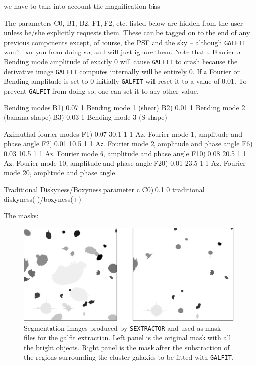 we have to take into account the magnification bias

The parameters C0, B1, B2, F1, F2, etc. listed below are hidden from the user unless he/she explicitly requests them.  These can  be tagged on to the end of any previous components except, of course, the PSF and the sky -- although \texttt{GALFIT} won't bar you from doing so, and will just ignore them.  Note that a Fourier or Bending mode amplitude of exactly 0 will cause \texttt{GALFIT} to crash because the derivative image \texttt{GALFIT} computes internally will be entirely 0.  If a Fourier or Bending amplitude is set to 0 initially \texttt{GALFIT} will reset it to a value of 0.01.  To prevent \texttt{GALFIT} from doing so, one can set it to any 
other value.

Bending modes
B1)  0.07      1        Bending mode 1 (shear)
B2)  0.01      1        Bending mode 2 (banana shape)
B3)  0.03      1        Bending mode 3 (S-shape)

Azimuthal fourier modes
F1)  0.07  30.1  1  1   Az. Fourier mode 1, amplitude and phase angle
F2)  0.01  10.5  1  1   Az. Fourier mode 2, amplitude and phase angle
F6)  0.03  10.5  1  1  Az. Fourier mode 6, amplitude and phase angle
F10)  0.08  20.5  1  1   Az. Fourier mode 10, amplitude and phase angle
F20)  0.01  23.5  1  1   Az. Fourier mode 20, amplitude and phase angle

Traditional Diskyness/Boxyness parameter c
C0) 0.1         0       traditional diskyness(-)/boxyness(+)

The masks:

\begin{figure}[H]
\centering
\includegraphics[width=15cm]{images/masks.png}
\caption[Segmentation images]{Segmentation images produced by \texttt{SEXTRACTOR} and used as mask files for the galfit extraction. Left panel is the original mask with all the bright objects. Right panel is the mask after the substraction of the regions surrounding the cluster galaxies to be fitted with \texttt{GALFIT}.}
\end{figure}

